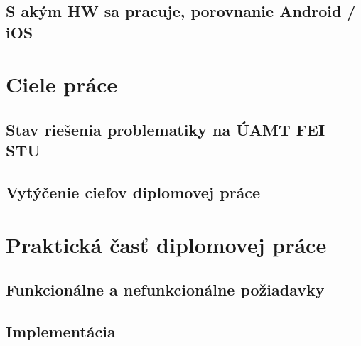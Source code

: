 \subsection{S akým HW sa pracuje, porovnanie Android / iOS}

\section{Ciele práce}
\subsection{Stav riešenia problematiky na ÚAMT FEI STU}
\subsection{Vytýčenie cieľov diplomovej práce}

\section{Praktická časť diplomovej práce}
\subsection{Funkcionálne a nefunkcionálne požiadavky}
\subsection{Implementácia}